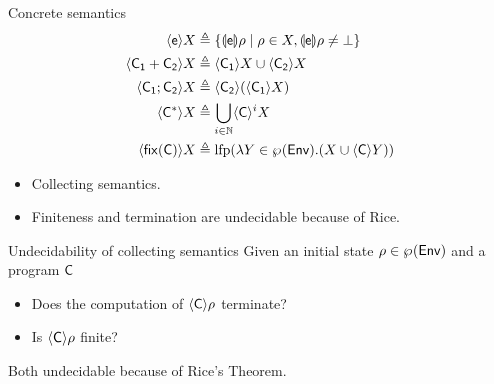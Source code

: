 \documentclass[presentation]{beamer}
\begin{document}
\begin{frame}[label={sec:orgffbc4ff}]{Concrete semantics}
\begin{align*}
  \sem{\com[e]} X & \defin \{\bsem{\com[e]} \rho \mid \rho \in X,
  \bsem{\com[e]} \rho \neq \bot\} \\
  \sem{\com[C_1] + \com[C_2]} X & \defin \sem{\com[C_1]} X \cup \sem{\com[C_2]} X \\
  \sem{\com[C_1] ; \com[C_2]} X & \defin \sem{\com[C_2]}(\sem{\com[C_1]} X) \\
  \sem{\com[C^*]} X & \defin \bigcup_{i \in \n} \sem{\com[C]}^i X \\
  \sem{\fix{C}} X & \defin \lfp(\lambda Y \in\poset{\env} . (X \cup \sem{\com}Y))
\end{align*}
\begin{itemize}
\item Collecting semantics.
\item Finiteness and termination are undecidable because of Rice.
\end{itemize}
\end{frame}

\begin{frame}[label={sec:orgad4f958}]{Undecidability of collecting semantics}
Given an initial state \(\rho \in \poset{\env}\) and a program
\(\com\)
\begin{itemize}
\item Does the computation of \(\sem{\com}\rho\) terminate?
\item Is \(\sem{\com}\rho\) finite?
\end{itemize}

\pause
Both \alert{undecidable} because of Rice's Theorem.
\end{frame}
\end{document}
